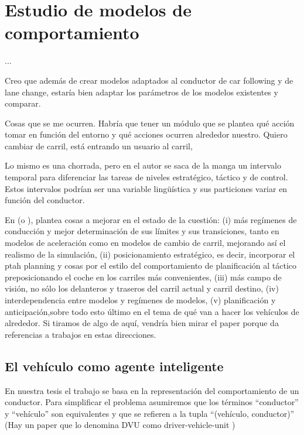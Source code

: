 \chapter{Estudio de modelos de comportamiento}
\label{ch:behavior-models-study}

...

Creo que además de crear modelos adaptados al conductor de car following y de lane change, estaría bien adaptar los parámetros de los modelos existentes y comparar.

Cosas que se me ocurren. Habría que tener un módulo que se plantea qué acción tomar en función del entorno y qué acciones ocurren alrededor nuestro. Quiero cambiar de carril, está entrando un usuario al carril,

Lo mismo es una chorrada, pero en \cite{Alexiadis2004} el autor se saca de la manga un intervalo temporal para diferenciar las tareas de niveles estratégico, táctico y de control. Estos intervalos podrían ser una variable lingüística y sus particiones variar en función del conductor.

En \cite{Toledo2007} (o \cite{Toledo2007-3}), plantea cosas a mejorar en el estado de la cuestión: (i) más regímenes de conducción y mejor determinación de sus límites y sus transiciones, tanto en modelos de aceleración como en modelos de cambio de carril, mejorando así el realismo de la simulación, (ii) posicionamiento estratégico, es decir, incorporar el ptah planning y cosas por el estilo del comportamiento de planificación al táctico preposicionando el coche en los carriles más convenientes, (iii) más campo de visión, no sólo los delanteros y traseros del carril actual y carril destino, (iv) interdependencia entre modelos y regímenes de modelos, (v) planificación y anticipación,sobre todo esto último en el tema de qué van a hacer los vehículos de alrededor. Si tiramos de algo de aquí, vendría bien mirar el paper porque da referencias a trabajos en estas direcciones.

\section{El vehículo como agente inteligente}

En nuestra tesis el trabajo se basa en la representación del comportamiento de un conductor. Para simplificar el problema asumiremos que los términos \enquote{conductor} y \enquote{vehículo} son equivalentes y que se refieren a la tupla \enquote{(vehículo, conductor)} (Hay un paper que lo denomina DVU como driver-vehicle-unit \cite{Dia2002})

